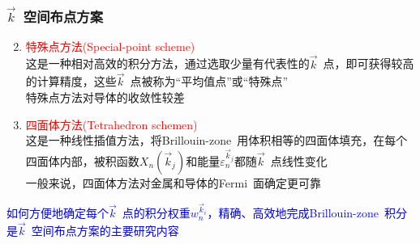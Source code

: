 \frame
{
\frametitle{$\vec k$~空间布点方案}
\begin{enumerate}
	\setcounter{enumi}{1}
\setlength{\itemsep}{10pt}
	\item \textcolor{red}{特殊点方法\textrm{(Special-point scheme)}}\\这是一种相对高效的积分方法，通过选取少量有代表性的$\vec k$~点，即可获得较高的计算精度，这些$\vec k$~点被称为“平均值点”或“特殊点”\\特殊点方法对导体的收敛性较差
	\item \textcolor{red}{四面体方法\textrm{(Tetrahedron schemen)}}\\这是一种线性插值方法，将\textrm{Brillouin-zone~}用体积相等的四面体填充，在每个四面体内部，被积函数$X_n(\vec k_j)$和能量$\varepsilon_n^{\vec k_j}$都随$\vec k$~点线性变化\\一般来说，四面体方法对金属和导体的\textrm{Fermi~}面确定更可靠
\end{enumerate}
\textcolor{blue}{如何方便地确定每个$\vec k$~点的积分权重$w_n^{\vec k_i}$，精确、高效地完成\textrm{Brillouin-zone~}积分是$\vec k$~空间布点方案的主要研究内容}
}

